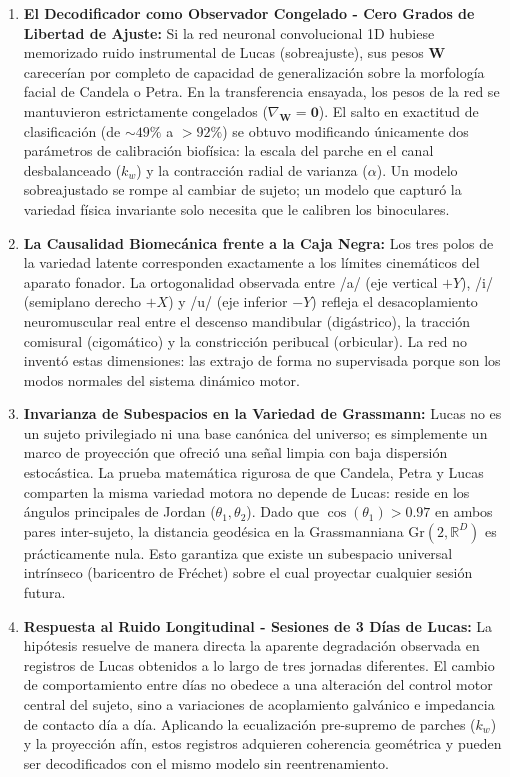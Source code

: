 \documentclass[11pt,a4paper,openany]{book}
\theoremstyle{definition}
\begin{document}
\begin{enumerate}
    \item \textbf{El Decodificador como Observador Congelado - Cero Grados de Libertad de Ajuste:} Si la red neuronal convolucional 1D hubiese memorizado ruido instrumental de Lucas (sobreajuste), sus pesos $\mathbf{W}$ carecerían por completo de capacidad de generalización sobre la morfología facial de Candela o Petra. En la transferencia ensayada, los pesos de la red se mantuvieron estrictamente congelados ($\nabla_{\mathbf{W}} = \mathbf{0}$). El salto en exactitud de clasificación (de $\sim 49\%$ a $>92\%$) se obtuvo modificando únicamente dos parámetros de calibración biofísica: la escala del parche en el canal desbalanceado ($k_w$) y la contracción radial de varianza ($\alpha$). Un modelo sobreajustado se rompe al cambiar de sujeto; un modelo que capturó la variedad física invariante solo necesita que le calibren los binoculares.
    \item \textbf{La Causalidad Biomecánica frente a la Caja Negra:} Los tres polos de la variedad latente corresponden exactamente a los límites cinemáticos del aparato fonador. La ortogonalidad observada entre /a/ (eje vertical $+Y$), /i/ (semiplano derecho $+X$) y /u/ (eje inferior $-Y$) refleja el desacoplamiento neuromuscular real entre el descenso mandibular (digástrico), la tracción comisural (cigomático) y la constricción peribucal (orbicular). La red no inventó estas dimensiones: las extrajo de forma no supervisada porque son los modos normales del sistema dinámico motor.
    \item \textbf{Invarianza de Subespacios en la Variedad de Grassmann:} Lucas no es un sujeto privilegiado ni una base canónica del universo; es simplemente un marco de proyección que ofreció una señal limpia con baja dispersión estocástica. La prueba matemática rigurosa de que Candela, Petra y Lucas comparten la misma variedad motora no depende de Lucas: reside en los ángulos principales de Jordan ($\theta_1, \theta_2$). Dado que $\cos(\theta_1) > 0.97$ en ambos pares inter-sujeto, la distancia geodésica en la Grassmanniana $\text{Gr}(2, \mathbb{R}^D)$ es prácticamente nula. Esto garantiza que existe un subespacio universal intrínseco (baricentro de Fréchet) sobre el cual proyectar cualquier sesión futura.
    \item \textbf{Respuesta al Ruido Longitudinal - Sesiones de 3 Días de Lucas:} La hipótesis resuelve de manera directa la aparente degradación observada en registros de Lucas obtenidos a lo largo de tres jornadas diferentes. El cambio de comportamiento entre días no obedece a una alteración del control motor central del sujeto, sino a variaciones de acoplamiento galvánico e impedancia de contacto día a día. Aplicando la ecualización pre-supremo de parches ($k_w$) y la proyección afín, estos registros adquieren coherencia geométrica y pueden ser decodificados con el mismo modelo sin reentrenamiento.
\end{enumerate}
\end{document}
